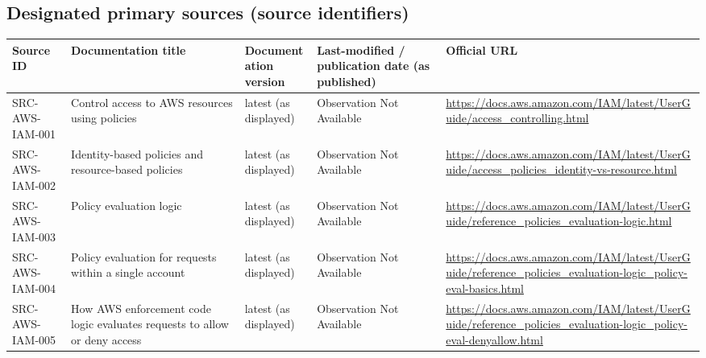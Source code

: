\documentclass[11pt]{article}
\begin{document}
\subsection*{Designated primary sources (source identifiers)}
\begin{longtable}{@{}L{1.6in}L{2.9in}L{1.0in}L{0.9in}L{1.9in}@{}}
\toprule
Source ID & Documentation title & Documentation version & Last-modified / publication date (as published) & Official URL\\
\midrule
\endhead
SRC-AWS-IAM-001 & Control access to AWS resources using policies & latest (as displayed) & Observation Not Available & \url{https://docs.aws.amazon.com/IAM/latest/UserGuide/access_controlling.html}\\
SRC-AWS-IAM-002 & Identity-based policies and resource-based policies & latest (as displayed) & Observation Not Available & \url{https://docs.aws.amazon.com/IAM/latest/UserGuide/access_policies_identity-vs-resource.html}\\
SRC-AWS-IAM-003 & Policy evaluation logic & latest (as displayed) & Observation Not Available & \url{https://docs.aws.amazon.com/IAM/latest/UserGuide/reference_policies_evaluation-logic.html}\\
SRC-AWS-IAM-004 & Policy evaluation for requests within a single account & latest (as displayed) & Observation Not Available & \url{https://docs.aws.amazon.com/IAM/latest/UserGuide/reference_policies_evaluation-logic_policy-eval-basics.html}\\
SRC-AWS-IAM-005 & How AWS enforcement code logic evaluates requests to allow or deny access & latest (as displayed) & Observation Not Available & \url{https://docs.aws.amazon.com/IAM/latest/UserGuide/reference_policies_evaluation-logic_policy-eval-denyallow.html}\\
\bottomrule
\end{longtable}
\end{document}
